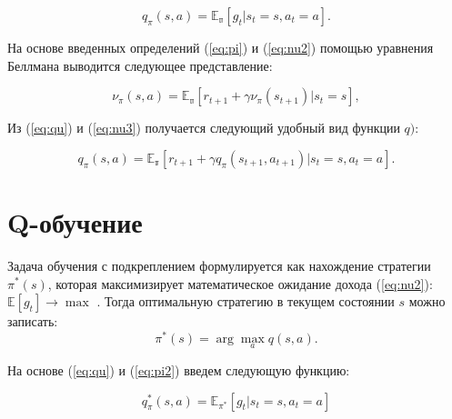 
\begin{equation}
    q_{\pi} (s, a)= \mathbb{E_{\pi}} [g_t | s_t = s, a_t = a].
    \label{eq:qu}
\end{equation}

На основе введенных определений (\ref{eq:pi}) и (\ref{eq:nu2})  помощью уравнения Беллмана выводится следующее представление:


\begin{equation}
	\nu_{\pi}(s, a) = \mathbb{E_\pi} [ r_{t+1} + \gamma \nu_\pi(s_{t+1}) | s_t=s],
	\label{eq:nu3}
\end{equation}

Из (\ref{eq:qu}) и (\ref{eq:nu3}) получается следующий удобный вид функции $q)$:

\begin{equation}
    q_{\pi}(s, a) = \mathbb{E_\pi} [ r_{t+1} + \gamma q_\pi(s_{t+1}, a_{t+1}) | s_t=s, a_t=a].
    \label{eq:q2}
\end{equation}


 
\section{Q-обучение}\label{1sec:optimal-control}


Задача обучения с подкреплением формулируется как нахождение стратегии $\pi^*(s)$, которая максимизирует математическое ожидание дохода (\ref{eq:nu2}): $\mathbb{E}[g_t] \to \max$ . Тогда оптимальную стратегию в текущем состоянии $s$ можно записать: 
\begin{equation}
    \pi^*(s) = \arg \max_a{q(s, a)}.
    \label{eq:pi2}
\end{equation}

На основе (\ref{eq:qu}) и (\ref{eq:pi2}) введем следующую функцию:

\begin{equation}
	q^*_{\pi}(s, a) = \mathbb{E}_{\pi^*} [g_t|s_t=s, a_t=a]
	\label{eq:qu**}
\end{equation}
 
